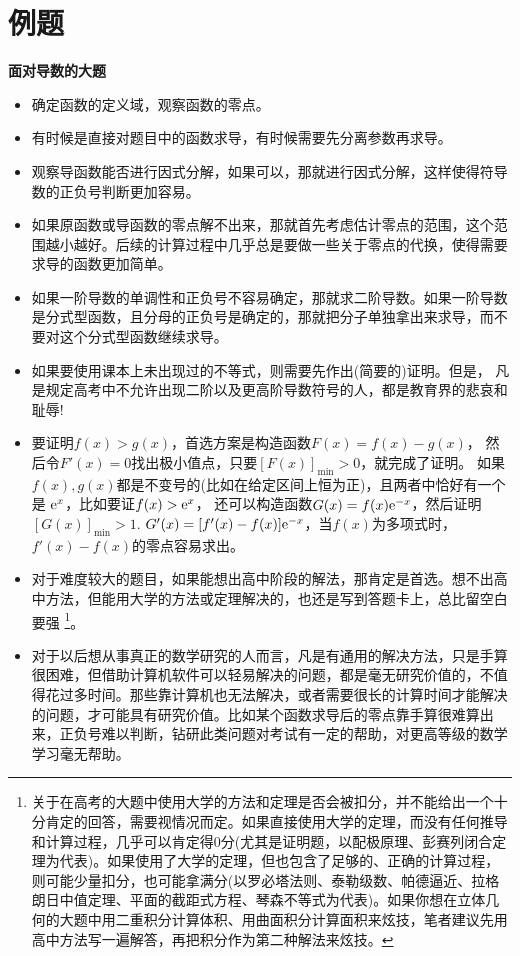 \section{例题}
\noindent \textbf{面对导数的大题}
\begin{itemize}[itemsep=-1pt]
\item 确定函数的定义域，观察函数的零点。
\item 有时候是直接对题目中的函数求导，有时候需要先分离参数再求导。
\item 观察导函数能否进行因式分解，如果可以，那就进行因式分解，这样使得符导数的正负号判断更加容易。
\item 如果原函数或导函数的零点解不出来，那就首先考虑估计零点的范围，这个范围越小越好。后续的计算过程中几乎总是要做一些关于零点的代换，使得需要求导的函数更加简单。
\item 如果一阶导数的单调性和正负号不容易确定，那就求二阶导数。如果一阶导数是分式型函数，且分母的正负号是确定的，那就把分子单独拿出来求导，而不要对这个分式型函数继续求导。
\item 如果要使用课本上未出现过的不等式，则需要先作出(简要的)证明。但是，
凡是规定高考中不允许出现二阶以及更高阶导数符号的人，都是教育界的悲哀和耻辱!
\item 要证明$ f(x)>g(x) $，首选方案是构造函数$ F(x)=f(x)-g(x) $，
然后令$ F'(x)=0 $找出极小值点，只要$ [F(x)]_{\min}>0 $，就完成了证明。
如果$ f(x),g(x) $都是不变号的(比如在给定区间上恒为正)，且两者中恰好有一个是
$ \mathrm{e}^x $，比如要证$ f(x)>\mathrm{e}^x $，
还可以构造函数$ G(x)=f(x)\mathrm{e}^{-x} $，然后证明$ [G(x)]_{\min}>1 $. 
$ G'(x)=[f'(x)-f(x)]\mathrm{e}^{-x} $，当$ f(x) $为多项式时，$ f'(x)-f(x) $的零点容易求出。
\item 对于难度较大的题目，如果能想出高中阶段的解法，那肯定是首选。想不出高中方法，但能用大学的方法或定理解决的，也还是写到答题卡上，总比留空白要强
\footnote{关于在高考的大题中使用大学的方法和定理是否会被扣分，并不能给出一个十分肯定的回答，需要视情况而定。如果直接使用大学的定理，而没有任何推导和计算过程，几乎可以肯定得0分(尤其是证明题，以配极原理、彭赛列闭合定理为代表)。如果使用了大学的定理，但也包含了足够的、正确的计算过程，则可能少量扣分，也可能拿满分(以罗必塔法则、泰勒级数、帕德逼近、拉格朗日中值定理、平面的截距式方程、琴森不等式为代表)。如果你想在立体几何的大题中用二重积分计算体积、用曲面积分计算面积来炫技，笔者建议先用高中方法写一遍解答，再把积分作为第二种解法来炫技。}。
\item 对于以后想从事真正的数学研究的人而言，凡是有通用的解决方法，只是手算很困难，但借助计算机软件可以轻易解决的问题，都是毫无研究价值的，不值得花过多时间。那些靠计算机也无法解决，或者需要很长的计算时间才能解决的问题，才可能具有研究价值。比如某个函数求导后的零点靠手算很难算出来，正负号难以判断，钻研此类问题对考试有一定的帮助，对更高等级的数学学习毫无帮助。
\end{itemize}

